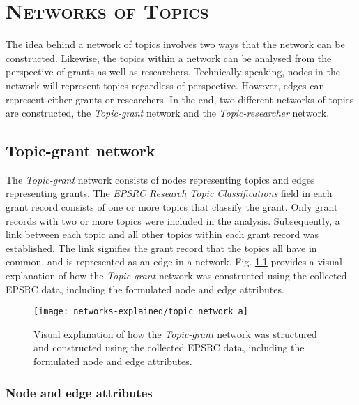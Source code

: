 \chapter{\textsc{Networks of Topics}}
\label{chapter:networks_of_topics}

The idea behind a network of topics involves two ways that the network can be constructed. Likewise, the topics within a network can be analysed from the perspective of grants as well as researchers. Technically speaking, nodes in the network will represent topics regardless of perspective. However, edges can represent either grants or researchers. In the end, two different networks of topics are constructed, the \textit{Topic-grant} network and the \textit{Topic-researcher} network.

\section{Topic-grant network}

The \textit{Topic-grant} network consists of nodes representing topics and edges representing grants. The \textit{EPSRC Research Topic Classifications} field in each grant record consists of one or more topics that classify the grant. Only grant records with two or more topics were included in the analysis. Subsequently, a link between each topic and all other topics within each grant record was established. The link signifies the grant record that the topics all have in common, and is represented as an edge in a network. Fig. \ref{figure:topic_a_structure} provides a visual explanation of how the \textit{Topic-grant} network was constructed using the collected EPSRC data, including the formulated node and edge attributes.

\begin{figure}[!htbp]
    \centering
    \texttt{[image: networks-explained/topic\_network\_a]}
    \caption[Visual explanation of how the \textit{Topic-grant} network was structured and constructed using the collected EPSRC data]{Visual explanation of how the \textit{Topic-grant} network was structured and constructed using the collected EPSRC data, including the formulated node and edge attributes.}
    \label{figure:topic_a_structure}
\end{figure}

\subsection{Node and edge attributes}

